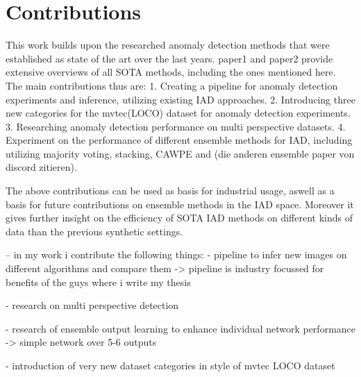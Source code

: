 \section{Contributions}
This work builds upon the researched anomaly detection methods that were established as state of the art over the last years. paper1 and paper2 provide extensive overviews of all SOTA methods,
including the ones mentioned here. The main contributions thus are:
1. Creating a pipeline for anomaly detection experiments and inference, utilizing existing IAD approaches. 
2. Introducing three new categories for the mvtec(LOCO) dataset for anomaly detection experiments.
3. Researching anomaly detection performance on multi perspective datasets.
4. Experiment on the performance of different ensemble methods for IAD, including utilizing majority voting, stacking, CAWPE and (die anderen ensemble paper von discord zitieren).

The above contributions can be used as basis for industrial usage, aswell as a basis for future contributions on ensemble methods in the IAD space. Moreover it gives further insight on the
efficiency of SOTA IAD methods on different kinds of data than the previous synthetic settings.



-- in my work i contribute the following things:
- pipeline to infer new images on different algorithms and compare them
-> pipeline is industry focussed for benefits of the guys where i write my thesis

- research on multi perspective detection

- research of ensemble output learning to enhance individual network performance
-> simple network over 5-6 outputs

- introduction of very new dataset categories in style of mvtec LOCO dataset

